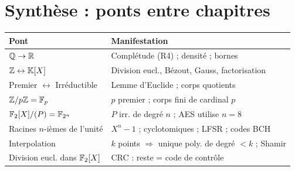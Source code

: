 \section{Synthèse : ponts entre chapitres}

\begin{center}
\renewcommand{\arraystretch}{1.4}
\begin{tabular}{|l|l|}
\hline
\textbf{Pont} & \textbf{Manifestation} \\
\hline
$\mathbb{Q} \to \mathbb{R}$ & Complétude (R4) ; densité ; bornes \\
$\mathbb{Z} \leftrightarrow \mathbb{K}[X]$ & Division eucl., Bézout, Gauss, factorisation \\
Premier $\leftrightarrow$ Irréductible & Lemme d'Euclide ; corps quotients \\
$\mathbb{Z}/p\mathbb{Z} = \mathbb{F}_p$ & $p$ premier ; corps fini de cardinal $p$ \\
$\mathbb{F}_2[X]/(P) = \mathbb{F}_{2^n}$ & $P$ irr. de degré $n$ ; AES utilise $n = 8$ \\
Racines $n$-ièmes de l'unité & $X^n - 1$ ; cyclotomiques ; LFSR ; codes BCH \\
Interpolation & $k$ points $\Rightarrow$ unique poly. de degré $< k$ ; Shamir \\
Division eucl. dans $\mathbb{F}_2[X]$ & CRC : reste = code de contrôle \\
\hline
\end{tabular}
\end{center}

